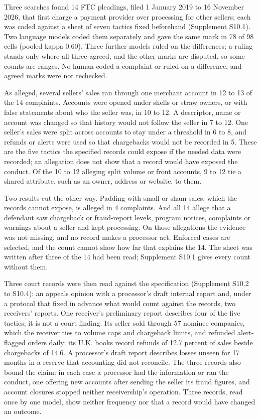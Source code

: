 \documentclass[
  11pt,
]{article}
\begin{document}
Three searches found 14 FTC pleadings, filed 1 January 2019 to 16
November 2026, that first charge a payment provider over processing for
other sellers; each was coded against a sheet of seven tactics fixed
beforehand (Supplement S10.1). Two language models coded them separately
and gave the same mark in 78 of 98 cells (pooled kappa 0.60). Three
further models ruled on the differences; a ruling stands only where all
three agreed, and the other marks are disputed, so some counts are
ranges. No human coded a complaint or ruled on a difference, and agreed
marks were not rechecked.

As alleged, several sellers' sales ran through one merchant account in
12 to 13 of the 14 complaints. Accounts were opened under shells or
straw owners, or with false statements about who the seller was, in 10
to 12. A descriptor, name or account was changed so that history would
not follow the seller in 7 to 12. One seller's sales were split across
accounts to stay under a threshold in 6 to 8, and refunds or alerts were
used so that chargebacks would not be recorded in 5. These are the five
tactics the specified records could expose if the needed data were
recorded; an allegation does not show that a record would have exposed
the conduct. Of the 10 to 12 alleging split volume or front accounts, 9
to 12 tie a shared attribute, such as an owner, address or website, to
them.

Two results cut the other way. Padding with small or sham sales, which
the records cannot expose, is alleged in 4 complaints. And all 14 allege
that a defendant saw chargeback or fraud-report levels, program notices,
complaints or warnings about a seller and kept processing. On those
allegations the evidence was not missing, and no record makes a
processor act. Enforced cases are selected, and the count cannot show
how far that explains the 14. The sheet was written after three of the
14 had been read; Supplement S10.1 gives every count without them.

Three court records were then read against the specification (Supplement
S10.2 to S10.4): an appeals opinion with a processor's draft internal
report and, under a protocol that fixed in advance what would count
against the records, two receivers' reports. One receiver's preliminary
report describes four of the five tactics; it is not a court finding.
Its seller sold through 57 nominee companies, which the receiver ties to
volume caps and chargeback limits, and refunded alert-flagged orders
daily; its U.K. books record refunds of 12.7 percent of sales beside
chargebacks of 14.6. A processor's draft report describes losses unseen
for 17 months in a reserve that accounting did not reconcile. The three
records also bound the claim: in each case a processor had the
information or ran the conduct, one offering new accounts after sending
the seller its fraud figures, and account closures stopped neither
receivership's operation. Three records, read once by one model, show
neither frequency nor that a record would have changed an outcome.
\end{document}
